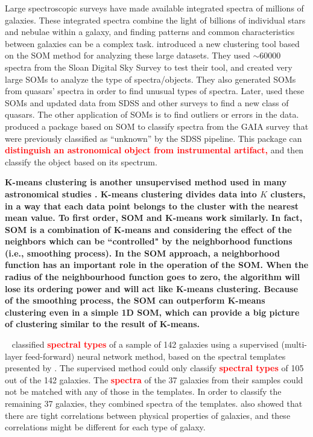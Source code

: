 Large spectroscopic surveys have made available integrated spectra of millions of galaxies.
These integrated spectra combine the light of billions of individual stars and nebulae within a galaxy, and
finding patterns and common characteristics between galaxies can be a complex task.
\citet{In12} introduced a new clustering tool based on the SOM method for analyzing these large datasets.
They used $\sim 60000$ spectra from the Sloan Digital Sky Survey \citep[SDSS;][]{Abazajian09} to test their tool, and created very large SOMs to analyze the type of spectra/objects.
They also generated SOMs from quasars' spectra in order to find unusual types of spectra. 
Later, \citet{Meusinger16} used these SOMs and updated data from SDSS and other surveys to find a new class of quasars.
The other application of SOMs is to find outliers or errors in the data.
\citet{Fustes13} produced a package based on SOM to classify spectra from the GAIA survey that were previously classified as ``unknown'' by the SDSS pipeline. This package can \textbf{\textcolor{red}{distinguish an astronomical object from instrumental artifact,}} and then classify the object based on its spectrum.

\textbf{K-means clustering is another unsupervised method used in many astronomical studies \citep[e.g.][]{DAbrusco12,Ordov14,Boersma14,Aycha16}.
K-means clustering divides data into $K$ clusters, in a way that each data point belongs to the cluster with the nearest mean value.
To first order, SOM and K-means work similarly.
In fact, SOM is a combination of K-means and considering the effect of the neighbors which can be ``controlled" by the neighborhood functions (i.e., smoothing process). 
In the SOM approach, a neighborhood function has an important role in the operation of the SOM. 
When the radius of the neighbourhood function goes to zero, the algorithm will lose its ordering power and will act like K-means clustering.
Because of the smoothing process, the SOM can outperform K-means clustering even in a simple 1D SOM, which can provide a big picture of clustering similar to the result of K-means.}

~\citet[][hereafter ]{Hossein12} classified \textbf{\textcolor{red}{spectral types}} of a sample of 142 galaxies using a supervised (multi-layer feed-forward) neural network method, based on the spectral templates presented by .
The supervised method could only classify \textbf{\textcolor{red}{spectral types}} of 105 out of the 142 galaxies.
The \textbf{\textcolor{red}{spectra}} of the 37 galaxies from their samples could not be matched with any of those in the  templates. 
In order to classify the remaining 37 galaxies, they combined spectra of the  templates.
 also showed that there are tight correlations between physical properties of galaxies, and these correlations might be different for each type of galaxy.

